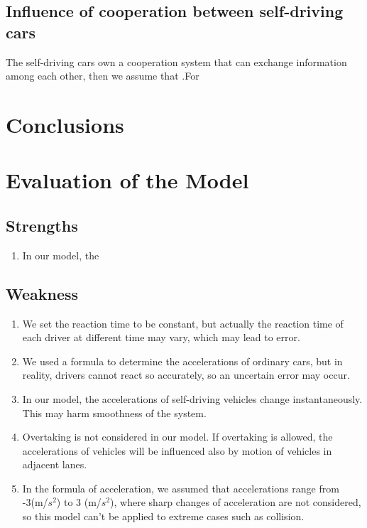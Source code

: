 \documentclass{icmmcm}
\begin{document}
\subsection{Influence of cooperation between self-driving cars}
The self-driving cars own a cooperation system that can exchange information among each other, then we assume that .For %

\section{Conclusions}
\section{Evaluation of the Model}
\subsection{Strengths}
\begin{enumerate}
\item In our model, the
\end{enumerate} 
\subsection{Weakness}
\begin{enumerate}
\item We set the reaction time to be constant, but actually the reaction time of each driver at different time may vary, which may lead to error.
\item We used a formula to determine the accelerations of ordinary cars, but in reality, drivers cannot react so accurately, so an uncertain error may occur.
\item In our model, the accelerations of self-driving vehicles change instantaneously. This may harm smoothness of the system.
\item Overtaking is not considered in our model. If overtaking is allowed, the accelerations of vehicles will be influenced also by motion of vehicles in adjacent lanes.
\item In the formula of acceleration, we assumed that accelerations range from -3(m/$s^{2}$) to 3 (m/$s^{2}$), where sharp changes of acceleration are not considered, so this model can't be applied to extreme cases such as collision.
\end{enumerate}







\end{document}
